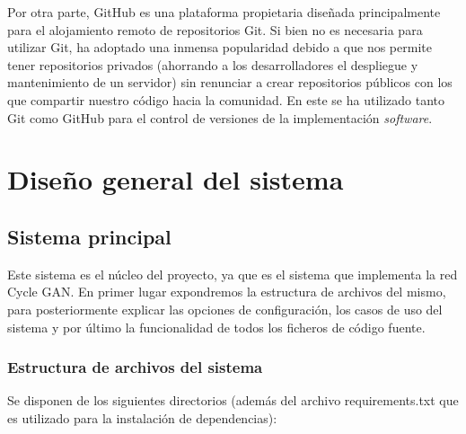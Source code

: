 \documentclass[../main.tex]{subfiles}
\begin{document}
Por otra parte, GitHub es una plataforma propietaria diseñada principalmente para el alojamiento remoto de repositorios Git. Si bien no es necesaria para utilizar Git, ha adoptado una inmensa popularidad debido a que nos permite tener repositorios privados (ahorrando a los desarrolladores el despliegue y mantenimiento de un servidor) sin renunciar a crear repositorios públicos con los que compartir nuestro código hacia la comunidad. En este \tfg se ha utilizado tanto Git como GitHub para el control de versiones de la implementación \textit{software}.

\section{Diseño general del sistema}
\subsection{Sistema principal}

Este sistema es el núcleo del proyecto, ya que es el sistema que implementa la red Cycle GAN. En primer lugar expondremos la estructura de archivos del mismo, para posteriormente explicar las opciones de configuración, los casos de uso del sistema y por último la funcionalidad de todos los ficheros de código fuente.

\subsubsection{Estructura de archivos del sistema}

Se disponen de los siguientes directorios (además del archivo requirements.txt que es utilizado para la instalación de dependencias):
\end{document}
